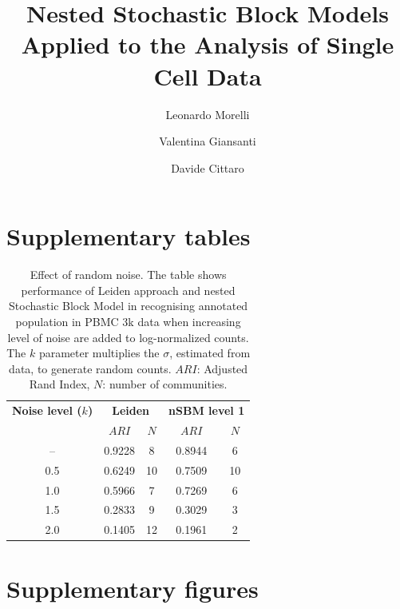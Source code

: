 \documentclass[11pt, titlepage, twoside]{article}
\begin{document}
\title{Nested Stochastic Block Models Applied to the Analysis of Single Cell Data}
\author[1,2]{Leonardo Morelli}
\author[1,3]{Valentina Giansanti}
\author[1]{Davide Cittaro}
\maketitle

\section*{Supplementary tables}
\begin{table}[h!]
\centering
 \begin{tabular}{||c|c c|c c||}
 \hline
\multicolumn{1}{||c|}{\textbf{Noise level ($k$)}} & \multicolumn{2}{c|}{\textbf{Leiden}} & \multicolumn{2}{c||}{\textbf{nSBM level 1}} \\

 & $ARI$ & $N$ & $ARI$ & $N$  \\ 
 \hline\hline
-- & 0.9228 & 8 & 0.8944 & 6 \\
\hline 
0.5 & 0.6249 & 10 & 0.7509  & 10 \\ 
 \hline
 1.0  & 0.5966 & 7 & 0.7269  & 6 \\
 \hline
 1.5  & 0.2833 & 9 &0.3029 & 3 \\
 \hline
 2.0  & 0.1405 & 12 & 0.1961 & 2 \\
 \hline
\end{tabular}
\caption{Effect of random noise. The table shows performance of Leiden approach and nested Stochastic Block Model in recognising annotated population in PBMC 3k data when increasing level of noise are added to log-normalized counts. The $k$ parameter multiplies the $\sigma$, estimated from data, to generate random counts. $ARI$: Adjusted Rand Index, $N$: number of communities.}
\label{Table_Noise}
\end{table}

\clearpage

\section*{Supplementary figures}
\end{document}
